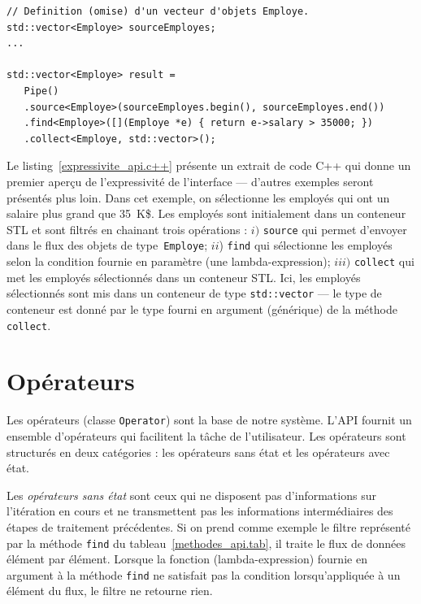 \begin{Listing}
{\small
\begin{lstlisting}
// Definition (omise) d'un vecteur d'objets Employe.
std::vector<Employe> sourceEmployes;
...

std::vector<Employe> result = 
   Pipe()
   .source<Employe>(sourceEmployes.begin(), sourceEmployes.end())
   .find<Employe>([](Employe *e) { return e->salary > 35000; })
   .collect<Employe, std::vector>();
\end{lstlisting}
}
\caption{Un exemple illustrant l'\'expressivit\'e de l'API de \ppff.}
\label{expressivite_api.c++}
\end{Listing}


Le listing~\ref{expressivite_api.c++} pr\'esente un extrait de code C++ qui donne un premier aper\c{c}u de l'expressivit\'e de l'interface --- d'autres exemples seront pr\'esent\'es plus loin. Dans cet exemple, on s\'electionne les employ\'es qui ont un salaire plus grand que 35~K\$. Les employ\'es sont initialement dans un conteneur STL et sont filtr\'es en chainant trois op\'erations : $i)$ \texttt{source} qui permet d'envoyer dans le flux des objets de type~\texttt{Employe}; $ii$) \texttt{find} qui s\'electionne les employ\'es selon la condition fournie en param\`etre (une lambda-expression); $iii)$ \texttt{collect} qui met les employ\'es s\'electionn\'es dans un conteneur STL. Ici, les employ\'es s\'electionn\'es sont mis dans un conteneur de type \texttt{std::vector} --- le type de conteneur est donn\'e par le type fourni en argument (g\'en\'erique) de la m\'ethode \texttt{collect}.




\section{Op\'erateurs}

Les op\'erateurs (classe \texttt{Operator}) sont la base de notre syst\`eme. L'API fournit un ensemble d'op\'erateurs qui facilitent la t\^ache de l'utilisateur. Les op\'erateurs sont structur\'es en deux cat\'egories : les op\'erateurs sans \'etat et les op\'erateurs avec \'etat.

Les \emph{op\'erateurs sans \'etat} sont ceux qui ne disposent pas d'informations sur l'it\'eration en cours et ne transmettent pas les informations interm\'ediaires des \'etapes de traitement pr\'ec\'edentes. Si on prend comme exemple le filtre repr\'esent\'e par la m\'ethode \texttt{find} du tableau~\ref{methodes_api.tab}, il traite le flux de donn\'ees \'el\'ement par \'el\'ement. 
%
Lorsque la fonction (lambda-expression) fournie en argument \`a la m\'ethode \texttt{find} ne satisfait pas la condition lorsqu'appliqu\'ee \`a un \'el\'ement du flux, le filtre ne retourne rien. 

